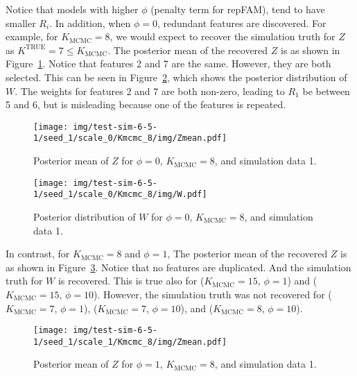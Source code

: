 \documentclass[12pt]{article} %
\def\true{\text{TRUE}}
\begin{document}
Notice that models with higher $\phi$ (penalty term for repFAM), tend to have
smaller $R_i$. In addition, when $\phi=0$, redundant features are discovered.
For example, for $K_\text{MCMC} = 8$, we would expect to recover the simulation
truth for $Z$ as $K^\true = 7 \le K_\text{MCMC}$. The posterior mean of the
recovered $Z$ is as shown in Figure~\ref{fig:kmcmc8-scale0-zmean}. Notice that
features 2 and 7 are the same.  However, they are both selected. This can be seen
in Figure~\ref{fig:kmcmc8-scale0-w}, which shows the posterior distribution of $W$.
The weights for features 2 and 7 are both non-zero, leading to $R_1$ be between
5 and 6, but is misleading because one of the features is repeated.

\begin{figure}[h]
  \begin{center}
    \texttt{[image: img/test-sim-6-5-1/seed\_1/scale\_0/Kmcmc\_8/img/Zmean.pdf]}
  \end{center}
  \caption{Posterior mean of $Z$ for $\phi=0$, $K_\text{MCMC}=8$, and
  simulation data 1.}
  \label{fig:kmcmc8-scale0-zmean}
\end{figure}

\begin{figure}[h]
  \begin{center}
    \texttt{[image: img/test-sim-6-5-1/seed\_1/scale\_0/Kmcmc\_8/img/W.pdf]}
  \end{center}
  \caption{Posterior distribution of $W$ for $\phi=0$, $K_\text{MCMC}=8$, and
  simulation data 1.}
  \label{fig:kmcmc8-scale0-w}
\end{figure}

In contrast, for $K_\text{MCMC} = 8$ and $\phi=1$, The posterior mean of the
recovered $Z$ is as shown in Figure~\ref{fig:kmcmc8-scale1-zmean}. Notice that
no features are duplicated.  And the simulation truth for $W$ is recovered.
This is true also for ($K_\text{MCMC}=15$, $\phi=1$) and ($K_\text{MCMC}=15$,
$\phi=10$).  However, the simulation truth was not recovered for
($K_\text{MCMC}=7$, $\phi=1$), ($K_\text{MCMC}=7$, $\phi=10$), and
($K_\text{MCMC}=8$, $\phi=10$).

\begin{figure}[h]
  \begin{center}
    \texttt{[image: img/test-sim-6-5-1/seed\_1/scale\_1/Kmcmc\_8/img/Zmean.pdf]}
  \end{center}
  \caption{Posterior mean of $Z$ for $\phi=1$, $K_\text{MCMC}=8$, and
  simulation data 1.}
  \label{fig:kmcmc8-scale1-zmean}
\end{figure}
\end{document}
